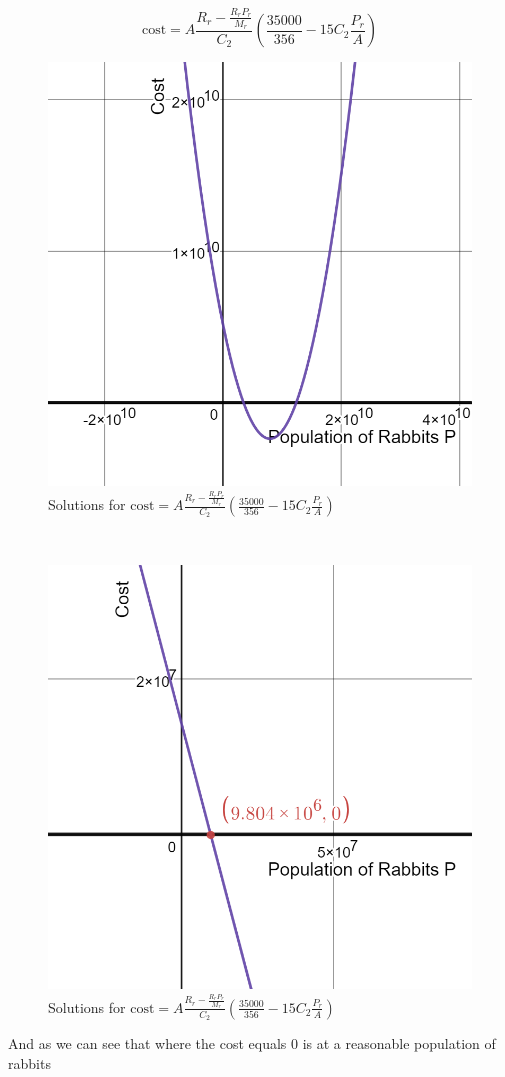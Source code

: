 \documentclass{article}
\begin{document}
$$\text{cost} = A\frac{R_r-\frac{R_rP_r}{M_r}}{C_2}(\frac{35000}{356}  -15C_2 \frac{P_r}{A}) $$
\begin{figure}[h!]
	\centering
	\includegraphics[scale=0.3]{Pictures/CostH}
	\caption{Solutions for $\text{cost} = A\frac{R_r-\frac{R_rP_r}{M_r}}{C_2}(\frac{35000}{356}  -15C_2 \frac{P_r}{A}) $ }
	\label{fig:Cost1}
\end{figure}
\\
\begin{figure}[h!]
	\centering
	\includegraphics[scale=0.3]{Pictures/CostH2}
	\caption{Solutions for $\text{cost} = A\frac{R_r-\frac{R_rP_r}{M_r}}{C_2}(\frac{35000}{356}  -15C_2 \frac{P_r}{A}) $ }
	\label{fig:Cost2}
\end{figure}
\newpage
And as we can see that where the cost equals 0 is at a reasonable population of rabbits
\end{document}

